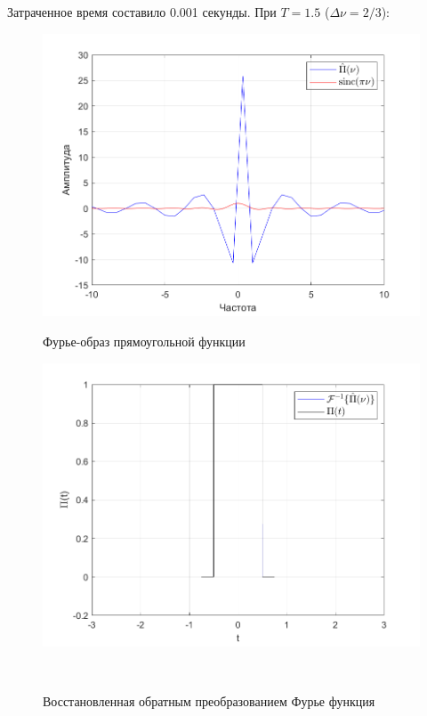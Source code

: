 \documentclass[a4paper]{article}
\begin{document}
Затраченное время составило 0.001 секунды. При $T = 1.5$ ($\Delta \nu = 2/3$):

\begin{figure}[H]
    \begin{minipage}{0.5\textwidth}
        \centering \includegraphics[width=\textwidth]{graphs/2/T_1.5_dt_0.001_V_1000_dv_0.66667/fourier_numerical.png}
        \caption{Фурье-образ прямоугольной функции}
    \end{minipage}\hfill
    \begin{minipage}{0.5\textwidth}
        \centering \includegraphics[width=\textwidth]{graphs/2/T_1.5_dt_0.001_V_1000_dv_0.66667/func_inversed_fourier.png}
        \caption{Восстановленная обратным преобразованием Фурье функция}
    \end{minipage}\\[1em]
\end{figure}\noindent\
\end{document}
